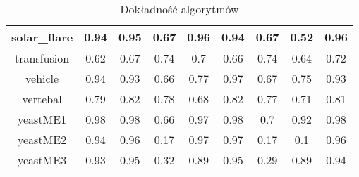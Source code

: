 \begin{table}[h]
\begin{center}
{\begin{tabular}{|c|c|c|c|c|c|c|c|c|}
				solar\_flare&0.94&0.95&0.67&0.96&0.94&0.67&0.52&0.96\\%
				\hline%
				transfusion&0.62&0.67&0.74&0.7&0.66&0.74&0.64&0.72\\%
				\hline%
				vehicle&0.94&0.93&0.66&0.77&0.97&0.67&0.75&0.93\\%
				\hline%
				vertebal&0.79&0.82&0.78&0.68&0.82&0.77&0.71&0.81\\%
				\hline%
				yeastME1&0.98&0.98&0.66&0.97&0.98&0.7&0.92&0.98\\%
				\hline%
				yeastME2&0.94&0.96&0.17&0.97&0.97&0.17&0.1&0.96\\%
				\hline%
				yeastME3&0.93&0.95&0.32&0.89&0.95&0.29&0.89&0.94\\%
				\hline%
			\end{tabular}}%
			\caption{Dokładność algorytmów}
			\label{tab1}
		\end{center}
	\end{table}
	
